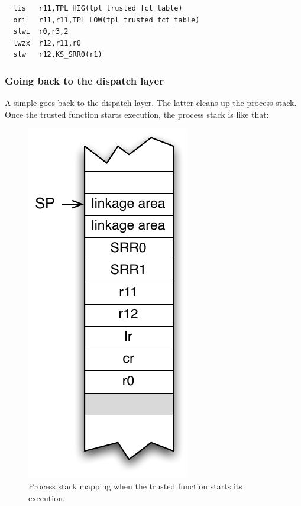 \begin{lstlisting}
  lis   r11,TPL_HIG(tpl_trusted_fct_table)
  ori   r11,r11,TPL_LOW(tpl_trusted_fct_table)
  slwi  r0,r3,2
  lwzx  r12,r11,r0
  stw   r12,KS_SRR0(r1)
\end{lstlisting}

\subsubsection{Going back to the dispatch layer}

A simple  goes back to the dispatch layer. The latter cleans up the process stack. Once the trusted function starts execution, the process stack is like that:

\begin{figure}[htbp] %
\begin{minipage}{0.5\textwidth}
    \centering
  \includegraphics[scale=.6]{pictures/TFStack2} 
\end{minipage}
\begin{minipage}{0.5\textwidth}
  \caption{Process stack mapping when the trusted function starts its execution.}\label{fig:tfstackmapping2}
\end{minipage}
\end{figure}

